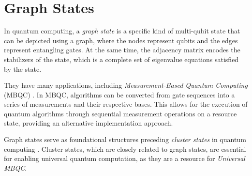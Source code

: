 \chapter{Graph States}
\label{Chap:graph_states}
\thispagestyle{fancy}

In quantum computing, a \emph{graph state} \cite{graph_state, rohde-graph-states} is a specific kind of multi-qubit state that can be depicted using a graph, where the nodes represent qubits and the edges represent entangling gates.
At the same time, the adjacency matrix encodes the stabilizers of the state, which is a complete set of eigenvalue equations satisfied by the state. 

They have many applications, including \emph{Measurement-Based Quantum Computing} (MBQC) \cite{MBQC}.
In MBQC, algorithms can be converted from gate sequences into a series of measurements and their respective bases. This allows for the execution of quantum algorithms through sequential measurement operations on a resource state, providing an alternative implementation approach.

Graph states serve as foundational structures preceding \emph{cluster states} in quantum computing \cite{cluster_state}.
Cluster states, which are closely related to graph states, are essential for enabling universal quantum computation, as they are a resource for \emph{Universal MBQC}.


